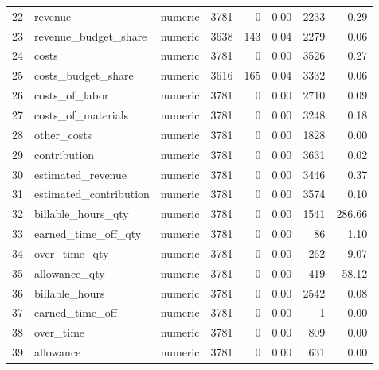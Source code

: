 \begin{sidewaystable}[ht]
\begin{tabular}{rllrrrrr}
  22 & revenue & numeric & 3781 &   0 & 0.00 & 2233 & 0.29 \\ 
  23 & revenue\_budget\_share & numeric & 3638 & 143 & 0.04 & 2279 & 0.06 \\ 
  24 & costs & numeric & 3781 &   0 & 0.00 & 3526 & 0.27 \\ 
  25 & costs\_budget\_share & numeric & 3616 & 165 & 0.04 & 3332 & 0.06 \\ 
  26 & costs\_of\_labor & numeric & 3781 &   0 & 0.00 & 2710 & 0.09 \\ 
  27 & costs\_of\_materials & numeric & 3781 &   0 & 0.00 & 3248 & 0.18 \\ 
  28 & other\_costs & numeric & 3781 &   0 & 0.00 & 1828 & 0.00 \\ 
  29 & contribution & numeric & 3781 &   0 & 0.00 & 3631 & 0.02 \\ 
  30 & estimated\_revenue & numeric & 3781 &   0 & 0.00 & 3446 & 0.37 \\ 
  31 & estimated\_contribution & numeric & 3781 &   0 & 0.00 & 3574 & 0.10 \\ 
  32 & billable\_hours\_qty & numeric & 3781 &   0 & 0.00 & 1541 & 286.66 \\ 
  33 & earned\_time\_off\_qty & numeric & 3781 &   0 & 0.00 &  86 & 1.10 \\ 
  34 & over\_time\_qty & numeric & 3781 &   0 & 0.00 & 262 & 9.07 \\ 
  35 & allowance\_qty & numeric & 3781 &   0 & 0.00 & 419 & 58.12 \\ 
  36 & billable\_hours & numeric & 3781 &   0 & 0.00 & 2542 & 0.08 \\ 
  37 & earned\_time\_off & numeric & 3781 &   0 & 0.00 &   1 & 0.00 \\ 
  38 & over\_time & numeric & 3781 &   0 & 0.00 & 809 & 0.00 \\ 
  39 & allowance & numeric & 3781 &   0 & 0.00 & 631 & 0.00 \\ 
   \hline
\end{tabular}
\end{sidewaystable}
